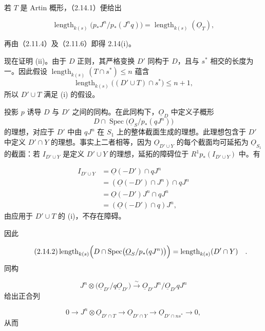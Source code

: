 若 $T$ 是 Artin 概形，（2.14.1）便给出

\begin{equation*}
\operatorname{length}_{k(s)}
\bigl(p_*J^n/p_*(J^nq)\bigr)
=\operatorname{length}_{k(s)}(\underline{O}_T),
\end{equation*}


再由（2.11.4）及（2.11.6）即得 2.14(i)。

现在证明 (ii)。由于 $D$ 正则，其严格变换 $D'$ 同构于 $D$，且与 $s^*$ 相交的长度为一。因此假设 $\operatorname{length}_{k(s)}(T\cap s^*)\leq n$ 蕴含
\[
\operatorname{length}_{k(s)}\bigl((D'\cup T)\cap s^*\bigr)\leq n+1,
\]
所以 $D'\cup T$ 满足 (i) 的假设。

投影 $p$ 诱导 $D$ 与 $D'$ 之间的同构。在此同构下，$\underline{O}_D$ 中定义子概形
\[
D\cap\operatorname{Spec}\bigl(\underline{O}_S/p_*(qJ^n)\bigr)
\]
的理想，对应于 $D'$ 中由 $qJ^n$ 在 $S_1$ 上的整体截面生成的理想。此理想包含于 $D'$ 中定义 $D'\cap Y$ 的理想。事实上二者相等，因为 $\underline{O}_{D'\cup Y}$ 的每个截面均可延拓为 $\underline{O}_{S_1}$ 的截面：若 $I_{D'\cup Y}$ 是定义 $D'\cup Y$ 的理想，延拓的障碍位于 $R^1p_*(I_{D'\cup Y})$ 中。有

\begin{equation*}
\begin{aligned}
I_{D'\cup Y}
&=\underline{O}(-D')\cap qJ^n\\
&=(\underline{O}(-D')\cap J^n)\cap qJ^n\\
&=\underline{O}(-D')J^n\cap qJ^n\\
&=(\underline{O}(-D')\cap q)J^n,
\end{aligned}
\end{equation*}
由应用于 $D'\cup T$ 的 (i)，不存在障碍。

因此

\begin{equation}\tag{2.14.2}
\operatorname{length}_{k(s)}
\Bigl(D\cap
\operatorname{Spec}\bigl(\underline{O}_S/p_*(qJ^n)\bigr)\Bigr)
=\operatorname{length}_{k(s)}(D'\cap Y) \quad .
\end{equation}
同构

\begin{equation*}
J^n\otimes
\bigl(\underline{O}_{D'}/q\underline{O}_{D'}\bigr)
\xrightarrow{\;\sim\;}
\underline{O}_{D'}J^n/
\underline{O}_{D'}qJ^n
\end{equation*}
给出正合列

\begin{equation*}
0\longrightarrow
J^n\otimes\underline{O}_{D'\cap T}
\longrightarrow\underline{O}_{D'\cap Y}
\longrightarrow\underline{O}_{D'\cap ns^*}
\longrightarrow0,
\end{equation*}
从而

